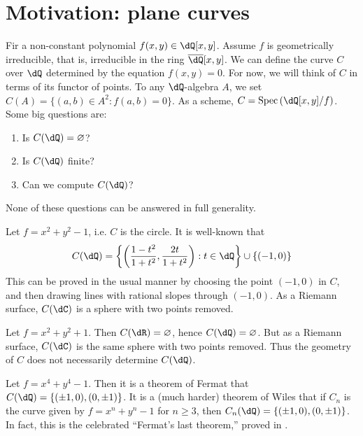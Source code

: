 \documentclass{article}
\begin{document}
\section*{Motivation: plane curves}





Fir a non-constant polynomial $f(x,y)\in\dQ[x,y]$. Assume $f$ is 
geometrically irreducible, that is, irreducible in the ring 
$\overline{\dQ}[x,y]$. We can define the curve $C$ over $\dQ$ determined by the 
equation $f(x,y)=0$. For now, we will think of $C$ in terms of its functor of 
points. To any $\dQ$-algebra $A$, we set $C(A)=\{(a,b)\in A^2:f(a,b)=0\}$. 
As a scheme, $C=\spec\left(\dQ[x,y]/f\right)$. Some big questions are:
\begin{enumerate}
  \item Is $C(\dQ)=\varnothing$?
  \item Is $C(\dQ)$ finite?
  \item Can we compute $C(\dQ)$?
\end{enumerate}
None of these questions can be answered in full generality. 

\begin{example}
Let $f=x^2+y^2-1$, i.e. $C$ is the circle. It is well-known that 
\[
  C(\dQ)=\left\{\left(\frac{1-t^2}{1+t^2},\frac{2t}{1+t^2}\right):t\in\dQ\right\}\cup \{(-1,0)\}
\]
This can be proved in the usual manner by choosing the point $(-1,0)$ in $C$, 
and then drawing lines with rational slopes through $(-1,0)$. As a Riemann 
surface, $C(\dC)$ is a sphere with two points removed. 
\end{example}

\begin{example}
Let $f=x^2+y^2+1$. Then $C(\dR)=\varnothing$, hence $C(\dQ)=\varnothing$. But 
as a Riemann surface, $C(\dC)$ is the same sphere with two points removed. Thus 
the geometry of $C$ does not necessarily determine $C(\dQ)$. 
\end{example}

\begin{example}
Let $f=x^4+y^4-1$. Then it is a theorem of Fermat that 
$C(\dQ)=\{(\pm 1,0),(0,\pm 1)\}$. It is a (much harder) theorem of Wiles that if 
$C_n$ is the curve given by $f=x^n+y^n-1$ for $n\geqslant 3$, then 
$C_n(\dQ)=\{(\pm 1,0),(0,\pm 1)\}$. In fact, this is the celebrated 
``Fermat's last theorem,'' proved in \cite{wi95}. 
\end{example}
\end{document}
